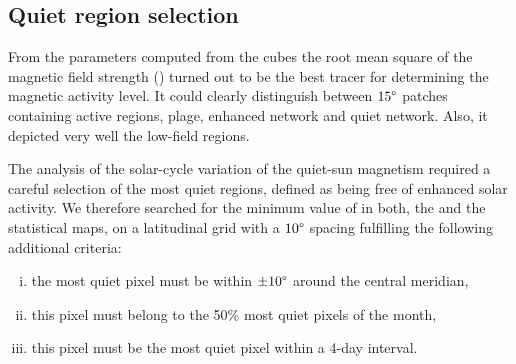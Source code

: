 \documentclass{aa}
\begin{document}
 

\subsection{Quiet region selection\label{quietregion}}

From the parameters computed from the cubes the root mean square of the magnetic field strength (\brms{}) turned out to be the best tracer for determining the magnetic activity level. It could clearly distinguish between $15\degree$ patches containing active regions, plage, enhanced network and quiet network. Also, it depicted very well the low-field \IN{} regions.

The analysis of the solar-cycle variation of the quiet-sun magnetism required a careful selection of the most quiet regions, defined as being free of enhanced solar activity. We therefore searched for the minimum value of \brms{} in both, the \nw{} and the \inw{} statistical maps, on a latitudinal grid with a $10\degree$ spacing fulfilling the following additional criteria:
\begin{enumerate}[(i)]
	\item\label{c1} the most quiet pixel must be within $\pm10\degree$ around the central meridian,
	\item\label{c2}  this pixel must belong to the 50\% most quiet pixels of the month,
	\item\label{c3}  this pixel must be the most quiet pixel within a 4-day interval.
\end{enumerate}
\end{document}

